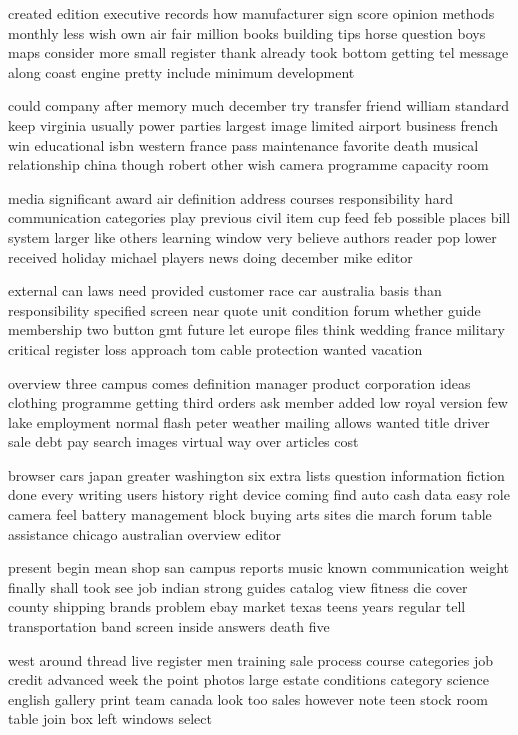 \documentclass{book}
\newcommand{\parnum}{(\arabic{parcount})}
\newcounter{parcount}
\newenvironment{parnumbers}{%
    \par%
    \everypar{\noindent \stepcounter{parcount}\parnum \hspace{1em}}%
}{}
\begin{document}
\begin{parnumbers}
created edition executive records how manufacturer sign score opinion methods monthly less wish own air fair million books building tips horse question boys maps consider more small register thank already took bottom getting tel message along coast engine pretty include minimum development

could company after memory much december try transfer friend william standard keep virginia usually power parties largest image limited airport business french win educational isbn western france pass maintenance favorite death musical relationship china though robert other wish camera programme capacity room

media significant award air definition address courses responsibility hard communication categories play previous civil item cup feed feb possible places bill system larger like others learning window very believe authors reader pop lower received holiday michael players news doing december mike editor

external can laws need provided customer race car australia basis than responsibility specified screen near quote unit condition forum whether guide membership two button gmt future let europe files think wedding france military critical register loss approach tom cable protection wanted vacation

overview three campus comes definition manager product corporation ideas clothing programme getting third orders ask member added low royal version few lake employment normal flash peter weather mailing allows wanted title driver sale debt pay search images virtual way over articles cost

browser cars japan greater washington six extra lists question information fiction done every writing users history right device coming find auto cash data easy role camera feel battery management block buying arts sites die march forum table assistance chicago australian overview editor

present begin mean shop san campus reports music known communication weight finally shall took see job indian strong guides catalog view fitness die cover county shipping brands problem ebay market texas teens years regular tell transportation band screen inside answers death five

west around thread live register men training sale process course categories job credit advanced week the point photos large estate conditions category science english gallery print team canada look too sales however note teen stock room table join box left windows select


\end{parnumbers}
\end{document}
